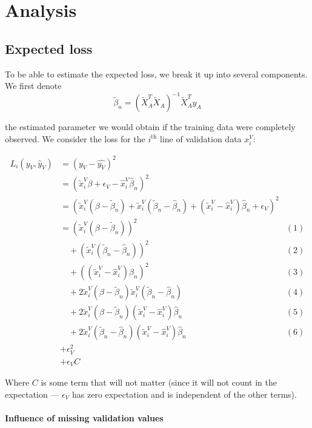 	\section{Analysis}
		\subsection{Expected loss}
To be able to estimate the expected loss, we break it up into several components. We first denote 
$$
\tilde{\beta}_n = (\tilde{X}_A^T \tilde{X}_A)^{-1} \tilde{X}_A^T y_A 
$$

the estimated parameter we would obtain if the training data were completely observed. We consider the loss for the $i^{\text{th}}$ line of validation data $x_i^V$:

\begin{align*}
L_i(y_V, \hat{y}_V) &= (y_V - \hat{y_V})^2 &\\
				   &= (\tilde{x}_i^V \beta + \epsilon_V - \hat{x}_i^V \hat{\beta}_n)^2 &\\
				   &= (\tilde{x}_i^V(\beta - \tilde{\beta}_n) + \tilde{x}_i^V (\tilde{\beta}_n - \hat{\beta}_n) + (\tilde{x}_i^V - \hat{x}_i^V) \hat{\beta}_n + \epsilon_V)^2 & \\
				   &= (\tilde{x}_i^V (\beta - \tilde{\beta}_n))^2 & (1) \\
				   & \quad + (\tilde{x}_i^V (\tilde{\beta}_n-\hat{\beta}_n))^2 &(2) \\
				   & \quad + ((\tilde{x}_i^V - \hat{x}_i^V) \hat{\beta}_n)^2 &(3) \\
				   & \quad +2 \tilde{x}_i^V (\beta - \tilde{\beta}_n) \tilde{x}_i^V (\tilde{\beta}_n - \hat{\beta}_n) & (4) \\
				   & \quad +2 \tilde{x}_i^V (\beta - \tilde{\beta}_n) (\tilde{x}_i^V - \hat{x}_i^V )\hat{\beta}_n & (5) \\
				   & \quad +2 \tilde{x}_i^V (\tilde{\beta}_n - \hat{\beta}_n) (\tilde{x}_i^V - \hat{x}_i^V) \hat{\beta}_n & (6)\\
				   & + \epsilon_V^2 &\\
				   & + \epsilon_V C
\end{align*}

Where $C$ is some term that will not matter (since it will not count in the expectation --- $\epsilon_V$ has zero expectation and is independent of the other terms). 

\paragraph{Influence of missing validation values}

